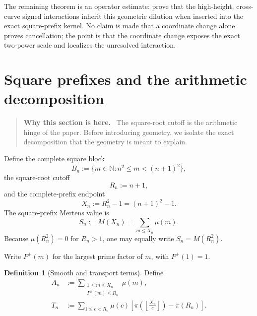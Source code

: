 \documentclass[11pt]{article}
\theoremstyle{definition}
\newtheorem{definition}[theorem]{Definition}
\theoremstyle{remark}
\newcommand{\Pplus}{P^{+}}
\newcommand{\1}{\mathbf{1}}
\newcommand{\N}{\mathbb{N}}
\newenvironment{motivation}
  {\begin{quote}\small\color{ovvogray}\textbf{Why this section is here.}\ }
  {\end{quote}}
\begin{document}
The remaining theorem is an operator estimate: prove that the high-height, cross-curve signed interactions inherit this geometric dilution when inserted into the exact square-prefix kernel.  No claim is made that a coordinate change alone proves cancellation; the point is that the coordinate change exposes the exact two-power scale and localizes the unresolved interaction.

\section{Square prefixes and the arithmetic decomposition}
\label{sec:arithmetic}

\begin{motivation}
The square-root cutoff is the arithmetic hinge of the paper.  Before introducing geometry, we isolate the exact decomposition that the geometry is meant to explain.
\end{motivation}

Define the complete square block
\begin{equation}
 B_n:=\{m\in\N:n^2\le m<(n+1)^2\},
 \label{eq:block}
\end{equation}
the square-root cutoff
\begin{equation}
 R_n:=n+1,
 \label{eq:Rn}
\end{equation}
and the complete-prefix endpoint
\begin{equation}
 X_n:=R_n^2-1=(n+1)^2-1.
 \label{eq:Xn}
\end{equation}
The square-prefix Mertens value is
\begin{equation}
 S_n:=M(X_n)=\sum_{m\le X_n}\mu(m).
 \label{eq:Sn}
\end{equation}
Because $\mu(R_n^2)=0$ for $R_n>1$, one may equally write $S_n=M(R_n^2)$.

Write $\Pplus(m)$ for the largest prime factor of $m$, with $\Pplus(1)=1$.

\begin{definition}[Smooth and transport terms]
\label{def:AT}
Define
\begin{align}
 A_n
 &:={\sum}_{\substack{1\le m\le X_n\\\Pplus(m)\le R_n}}\mu(m),
 \label{eq:An}\\
 T_n
 &:={\sum}_{1\le c<R_n}\mu(c)
 \left[
 \pi\!\left(\left\lfloor\frac{X_n}{c}\right\rfloor\right)-\pi(R_n)
 \right].
 \label{eq:Tn}
\end{align}
\end{definition}
\end{document}
